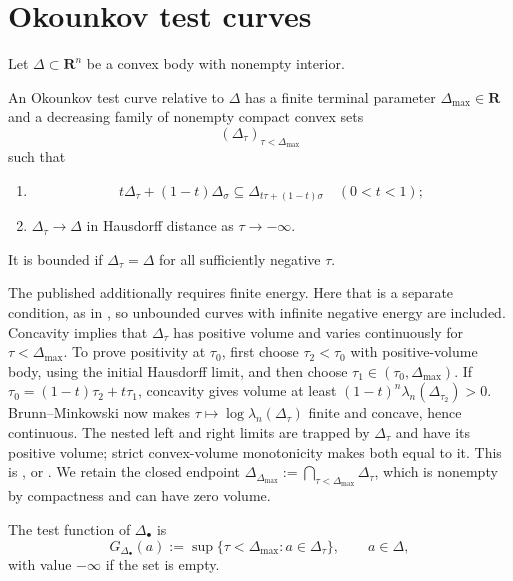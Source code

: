 \section{Okounkov test curves}
\label{sec:ok-test-curves}

Let $\Delta\subset\mathbf R^n$ be a convex body with nonempty interior.

\begin{definition}
\label{def:ok-test-curve}
An Okounkov test curve relative to $\Delta$ has a finite terminal
parameter $\Delta_{\max}\in\mathbf R$ and a decreasing family of
nonempty compact convex sets
\[
                  (\Delta_\tau)_{\tau<\Delta_{\max}}
\]
such that
\begin{enumerate}
\item
\[
 t\Delta_\tau+(1-t)\Delta_\sigma
       \subseteq\Delta_{t\tau+(1-t)\sigma}
\quad(0<t<1);
\tag{55.13}\label{eq:ok-body-concavity}
\]
\item $\Delta_\tau\to\Delta$ in Hausdorff distance as
$\tau\to-\infty$.
\end{enumerate}
It is bounded if $\Delta_\tau=\Delta$ for all sufficiently negative
$\tau$.
\end{definition}

The published \cite[Definitions~7.2 and~7.4]{Xia21} additionally requires
finite energy.  Here that is a separate condition, as in
\cite[Definitions~10.5.1--10.5.2]{XiaBook}, so unbounded curves with
infinite negative energy are included.
Concavity implies that $\Delta_\tau$ has positive volume and varies
continuously for $\tau<\Delta_{\max}$.
To prove positivity at $\tau_0$, first choose $\tau_2<\tau_0$ with
positive-volume body, using the initial Hausdorff limit, and then choose
$\tau_1\in(\tau_0,\Delta_{\max})$.
If $\tau_0=(1-t)\tau_2+t\tau_1$, concavity gives volume at least
$(1-t)^n\lambda_n(\Delta_{\tau_2})>0$.
Brunn--Minkowski now makes
$\tau\mapsto\log\lambda_n(\Delta_\tau)$ finite and concave, hence
continuous.  The nested left and right limits are trapped by
$\Delta_\tau$ and have its positive volume; strict convex-volume
monotonicity makes both equal to it.
This is \cite[Proposition~7.3]{Xia21}, or
\cite[Proposition~10.5.1]{XiaBook}.
We retain the closed endpoint
$\Delta_{\Delta_{\max}}:=\bigcap_{\tau<\Delta_{\max}}\Delta_\tau$,
which is nonempty by compactness and can have zero volume.

\begin{definition}
\label{def:ok-test-function}
The test function of $\Delta_\bullet$ is
\[
 G_{\Delta_\bullet}(a)
 :=\sup\{\tau<\Delta_{\max}:a\in\Delta_\tau\},
 \qquad a\in\Delta,
\tag{55.14}\label{eq:ok-legendre-function}
\]
with value $-\infty$ if the set is empty.
\end{definition}

